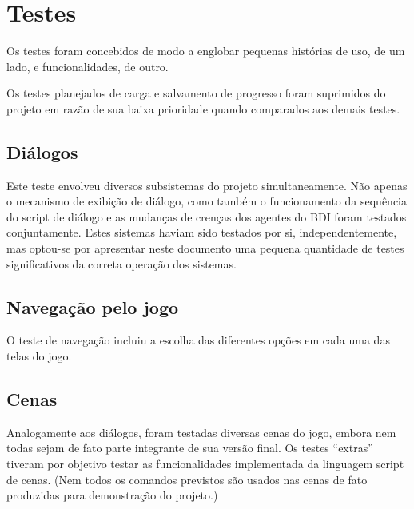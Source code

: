 \chapter{Testes}


Os testes foram concebidos de modo a englobar pequenas histórias de
uso, de um lado, e funcionalidades, de outro.

Os testes planejados de carga e salvamento de progresso foram suprimidos do projeto em razão de sua baixa prioridade quando comparados aos demais testes.

\section{Diálogos}

Este teste envolveu diversos subsistemas do projeto simultaneamente. Não apenas o mecanismo de exibição de diálogo, como também o funcionamento da sequência do script de diálogo e as mudanças de crenças dos agentes do BDI foram testados conjuntamente. Estes sistemas haviam sido testados por si, independentemente, mas optou-se por apresentar neste documento uma pequena quantidade de testes significativos da correta operação dos sistemas.

\section{Navegação pelo jogo}

O teste de navegação incluiu a escolha das diferentes opções em cada uma das telas do jogo.

\section{Cenas}

Analogamente aos diálogos, foram testadas diversas cenas do jogo, embora nem todas sejam de fato parte integrante de sua versão final. Os testes ``extras'' tiveram por objetivo testar as funcionalidades implementada da linguagem script de cenas. (Nem todos os comandos previstos são usados nas cenas de fato produzidas para demonstração do projeto.)


